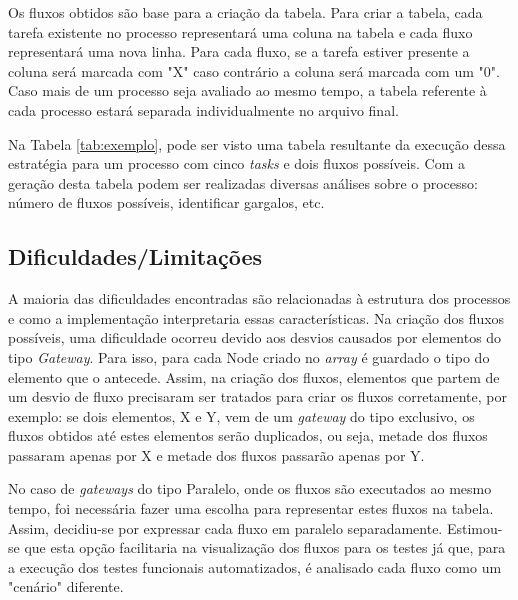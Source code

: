 \documentclass[12pt]{article}
\begin{document}
Os fluxos obtidos são base para a criação da tabela. Para criar a tabela, cada tarefa existente no processo representará uma coluna na tabela e cada fluxo representará uma nova linha. Para cada fluxo, se a tarefa estiver presente a coluna será marcada com "X" caso contrário a coluna será marcada com um "0". Caso mais de um processo seja avaliado ao mesmo tempo, a tabela referente à cada processo estará separada individualmente no arquivo final. 

Na Tabela \ref{tab:exemplo}, pode ser visto uma tabela resultante da execução dessa estratégia para um processo com cinco \emph{tasks} e dois fluxos possíveis. Com a geração desta tabela podem ser realizadas diversas análises sobre o processo: número de fluxos possíveis, identificar gargalos, etc.

\begin{table}[]
\centering
\caption{Exemplo de tabela resultante}
\label{tab:exemplo}
\end{table}

\subsection{Dificuldades/Limitações}
A maioria das dificuldades encontradas são relacionadas à estrutura dos processos e como a implementação interpretaria essas características. Na criação dos fluxos possíveis, uma dificuldade ocorreu devido aos desvios causados por elementos do tipo \emph{Gateway}. Para isso, para cada Node criado no \emph{array} é guardado o tipo do elemento que o antecede. Assim, na criação dos fluxos, elementos que partem de um desvio de fluxo precisaram ser tratados para criar os fluxos corretamente, por exemplo: se dois elementos, X e Y, vem de um \emph{gateway} do tipo  exclusivo, os fluxos obtidos até estes elementos serão duplicados, ou seja, metade dos fluxos passaram apenas por X e metade dos fluxos passarão apenas por Y.

No caso de \emph{gateways} do tipo Paralelo, onde os fluxos são executados ao mesmo tempo, foi necessária fazer uma escolha para representar estes fluxos na tabela. Assim, decidiu-se por expressar cada fluxo em paralelo separadamente. Estimou-se que esta opção facilitaria na visualização dos fluxos para os testes já que, para a execução dos testes funcionais automatizados, é analisado cada fluxo como um "cenário" diferente.
\end{document}
